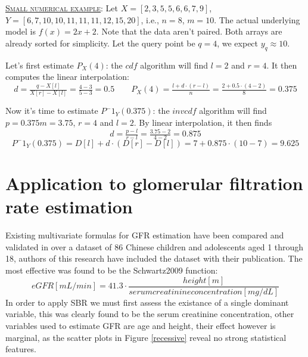 \documentclass[10pt,final]{siamltex}
\begin{document}
\begin{tcolorbox}[colback=gray!30,%
  colframe=black,%
  width=\dimexpr\linewidth-2\fboxrule\relax,
  arc=3mm, auto outer arc,
  breakable
  ]
  \underline{\textsc{Small numerical example}}: Let $X=[2,3,5,5,6,6,7,9]$, $Y=[6,7,10,10,11,11,11,12,15,20]$, i.e., $n=8$, $m=10$. The actual underlying model is $f(x)=2x+2$. Note that the data aren't paired. Both arrays are already sorted for simplicity. Let the query point be $q=4$, we expect $y_q\approx10$.

Let's first estimate $P_X(4)$: the $cdf$ algorithm will find $l=2$ and $r=4$. It then computes the linear interpolation:
  \begin{equation*}
    d = \tfrac{q-X[l]}{X[r]-X[l]} = \tfrac{4-3}{5-3} = 0.5
    \quad\quad
    P_X(4)=\tfrac{l+d\cdot(r-l)}{n}=\tfrac{2+0.5\cdot(4-2)}{8}=0.375
  \end{equation*}

Now it's time to estimate $P^-1_Y(0.375)$: the $invcdf$ algorithm will find $p = 0.375  m=3.75$, $r=4$ and $l=2$. By linear interpolation, it then finds
    \begin{equation*}
      d = \tfrac{p-l}{r-l} = \tfrac{3.75-2}{4-2} = 0.875
    \end{equation*}
    \begin{equation*}
      P^-1_Y(0.375)=D[l]+d\cdot(D[r]-D[l])=7+0.875\cdot(10-7)=9.625
    \end{equation*}
\end{tcolorbox}
%
\section{Application to glomerular filtration rate estimation}\label{sec3}

Existing multivariate formulas for GFR estimation have been compared and validated  in \cite{gfr} over a dataset of 86 Chinese children and adolescents aged 1 through 18, authors of this research have included the dataset with their publication. The most effective was found to be the Schwartz2009 function:
$$ eGFR[mL/min] = 41.3 \cdot \frac{height [m]}{serum creatinine concentration[mg/dL]}$$
In order to apply SBR we must first assess the existance of a single dominant variable, this was clearly found to be the serum creatinine concentration, other variables used to estimate GFR are age and height, their effect however is marginal, as the scatter plots in Figure \ref{recessive} reveal no strong statistical features.
\end{document}
